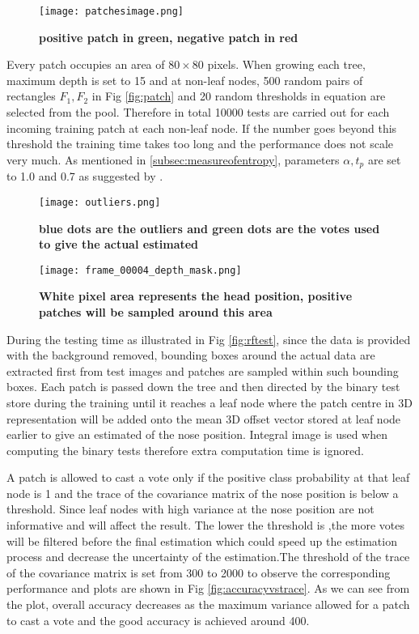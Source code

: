 \begin{figure}
	\centering
	\texttt{[image: patchesimage.png]}
	\caption[depth image with positive and negative patches]{\label{fig:patchi}}  \textbf{positive patch in green, negative patch in red } \cite{GFRF}
\end{figure}

Every patch occupies an area of $80 \times 80 $ pixels. When growing each tree, maximum depth is set to 15 and at non-leaf nodes, 500 random pairs of rectangles $F_{1}, F_{2}$ in Fig \ref{fig:patch} and 20 random thresholds in equation  are selected from the pool. Therefore in total 10000 tests are carried out for each incoming training patch at each non-leaf node. If the number goes beyond this threshold the training time takes too long and the performance does not scale very much. As mentioned in \ref{subsec:measureofentropy}, parameters $\alpha, t_{p}$ are set to 1.0 and 0.7 as suggested by \cite{okada}.

\begin{figure}
	\centering
	\texttt{[image: outliers.png]}
	\caption[outliers]{\label{fig:outliers}}  \textbf{blue dots are the outliers and green dots are the votes used to give the actual estimated } \cite{GFRF}
\end{figure}

\begin{figure}
	\centering
	\texttt{[image: frame\_00004\_depth\_mask.png]}
	\caption[Head mask used to select positive patch]{\label{fig:headmask}}  \textbf{White pixel area represents the head position, positive patches will be sampled around this area } 
\end{figure}

During the testing time as illustrated in Fig \ref{fig:rftest}, since the data is provided with the background removed, bounding boxes around the actual data are extracted first from test images and patches are sampled within such bounding boxes. Each patch is passed down the tree and then directed by the binary test store during the training until it reaches a leaf node where the patch centre in 3D representation will be added onto the mean 3D offset vector stored at leaf node earlier to give an estimated of the nose position. Integral image is used when computing the binary tests therefore extra computation time is ignored. 

A patch is allowed to cast a vote only if the positive class probability at that leaf node is 1 and the trace of the covariance matrix of the nose position is below a threshold. Since leaf nodes with high variance at the nose position are not informative and will affect the result. The lower the threshold is ,the more votes will be filtered before the final estimation which could speed up the estimation process and decrease the uncertainty of the estimation.The threshold of the trace of the covariance matrix is set from 300 to 2000 to observe the corresponding performance and plots are shown in Fig \ref{fig:accuracyvstrace}. As we can see from the plot, overall accuracy decreases as the maximum variance allowed for a patch to cast a vote and the good accuracy is achieved around 400.

